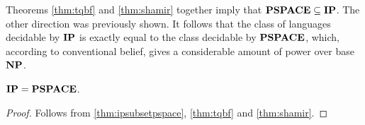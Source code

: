 Theorems \ref{thm:tqbf} and \ref{thm:shamir} together imply that $\mathbf{PSPACE}\subseteq\mathbf{IP}$. The other direction was previously shown. It follows that the class of languages decidable by $\mathbf{IP}$ is exactly equal to the class decidable by $\mathbf{PSPACE}$, which, according to conventional belief, gives a considerable amount of power over base $\mathbf{NP}$.

\begin{theorem}
	\label{thm:ip=pspace}
	$\mathbf{IP}=\mathbf{PSPACE}$.
\end{theorem}
\begin{proof}
	Follows from \ref{thm:ipsubsetpspace}, \ref{thm:tqbf} and \ref{thm:shamir}.
\end{proof}